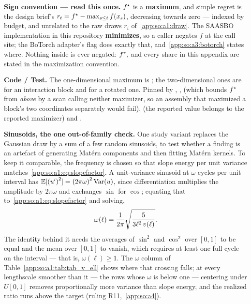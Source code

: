 \medskip \noindent\textbf{Sign convention --- read this once.} $f^\star$ is a
\textbf{maximum}, and simple regret is the design brief's
$r_t=f^\star-\max_{s\le t}f(x_s)$, decreasing towards zero --- indexed by
budget, and unrelated to the raw draws $r_i$ of~\ref{app:so:a1:draw}. The
SAASBO implementation in this repository \textbf{minimizes}, so a caller
negates $f$ at the call site; the BoTorch adapter's  flag does
exactly that, and~\ref{app:so:a3:botorch} states where. Nothing inside
 is ever negated: $f^\star$,  and every
share in this appendix are stated in the maximization convention.
\medskip

\begin{sloppypar}
\textbf{Code / Test.} The one-dimensional maximum is
; the two-dimensional ones are
 for an interaction block and
 for a rotated one. Pinned by
,
,
 (which bounds
$f^\star$ from \emph{above} by a scan calling neither maximizer, so an assembly
that maximized a block's two coordinates separately would fail),
 (the reported value belongs to the reported
maximizer) and
.
\end{sloppypar}

\label{app:so:a1:generators}

\textbf{Sinusoids, the one out-of-family check.} One study variant replaces
the Gaussian draw by a sum of a few random sinusoids, to test whether a
finding is an artefact of generating Mat\'ern components and then fitting
Mat\'ern kernels. To keep it comparable, the frequency is chosen so that slope
energy per unit variance matches~\eqref{app:so:a1:eq:slopefactor}. A
unit-variance sinusoid at $\omega$ cycles per unit interval has
$\Ex{}[{(u')}^2]={(2\pi\omega)}^2\Varx{}(u)$, since differentiation multiplies
the amplitude by $2\pi\omega$ and exchanges $\sin$ for $\cos$; equating that
to~\eqref{app:so:a1:eq:slopefactor} and solving,
\begin{equation}\label{app:so:a1:eq:omega}
  \omega(\ell)=\frac{1}{2\pi}\sqrt{\frac{5}{3\ell^2\,v(\ell)}}.
\end{equation}
The identity behind it needs the averages of $\sin^2$ and $\cos^2$ over
$[0,1]$ to be equal and the mean over $[0,1]$ to vanish, which requires at
least one full cycle on the interval --- that is, $\omega(\ell)\ge1$. The
$\omega$ column of Table~\ref{app:so:a1:tab:tab_v_ell} shows where that
crossing falls; at every lengthscale smoother than it --- the rows whose
$\omega$ is below one --- centering under $U[0,1]$ removes proportionally more
variance than slope energy, and the realized ratio runs above the target
(ruling R11,~\ref{app:so:a4}).

